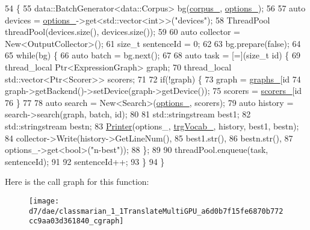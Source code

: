 \begin{DoxyCode}
54              \{
55     data::BatchGenerator<data::Corpus> bg(\hyperlink{classmarian_1_1TranslateMultiGPU_a7fce5f63667fe7a8dbdf94d1146aa2f8}{corpus\_}, \hyperlink{classmarian_1_1TranslateMultiGPU_aee684bc13d5c8a9f84c1a1a18a73a147}{options\_});
56 
57     \textcolor{keyword}{auto} devices = \hyperlink{classmarian_1_1TranslateMultiGPU_aee684bc13d5c8a9f84c1a1a18a73a147}{options\_}->get<std::vector<int>>(\textcolor{stringliteral}{"devices"});
58     ThreadPool threadPool(devices.size(), devices.size());
59 
60     \textcolor{keyword}{auto} collector = New<OutputCollector>();
61     \textcolor{keywordtype}{size\_t} sentenceId = 0;
62 
63     bg.prepare(\textcolor{keyword}{false});
64 
65     \textcolor{keywordflow}{while}(bg) \{
66       \textcolor{keyword}{auto} batch = bg.next();
67 
68       \textcolor{keyword}{auto} task = [=](\textcolor{keywordtype}{size\_t} id) \{
69         thread\_local Ptr<ExpressionGraph> graph;
70         thread\_local std::vector<Ptr<Scorer>> scorers;
71 
72         \textcolor{keywordflow}{if}(!graph) \{
73           graph = \hyperlink{classmarian_1_1TranslateMultiGPU_ab4ffb4c6d4e65d3cc564f0b290f0bc72}{graphs\_}[\textcolor{keywordtype}{id} %
74           graph->getBackend()->setDevice(graph->getDevice());
75           scorers = \hyperlink{classmarian_1_1TranslateMultiGPU_a783f8e4ecfcba37a2dc516fc685a403d}{scorers\_}[\textcolor{keywordtype}{id} %
76         \}
77 
78         \textcolor{keyword}{auto} search = New<Search>(\hyperlink{classmarian_1_1TranslateMultiGPU_aee684bc13d5c8a9f84c1a1a18a73a147}{options\_}, scorers);
79         \textcolor{keyword}{auto} history = search->search(graph, batch, \textcolor{keywordtype}{id});
80 
81         std::stringstream best1;
82         std::stringstream bestn;
83         \hyperlink{namespacemarian_a3a6ae585e5e6554beee2ab09a6433e83}{Printer}(options\_, \hyperlink{classmarian_1_1TranslateMultiGPU_a7a87528adeb1af7db2bdd9880634cd24}{trgVocab\_}, history, best1, bestn);
84         collector->Write(history->GetLineNum(),
85                          best1.str(),
86                          bestn.str(),
87                          options\_->get<\textcolor{keywordtype}{bool}>(\textcolor{stringliteral}{"n-best"}));
88       \};
89 
90       threadPool.enqueue(task, sentenceId);
91 
92       sentenceId++;
93     \}
94   \}
\end{DoxyCode}


Here is the call graph for this function\+:
\nopagebreak
\begin{figure}[H]
\begin{center}
\leavevmode
\texttt{[image: d7/dae/classmarian\_1\_1TranslateMultiGPU\_a6d0b7f15fe6870b772cc9aa03d361840\_cgraph]}
\end{center}
\end{figure}




